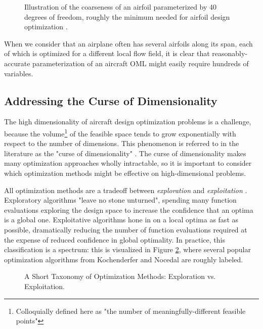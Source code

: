 \begin{figure}[H]
    \centering
    \ifdraft{}{}
    \caption{Illustration of the coarseness of an airfoil parameterized by 40 degrees of freedom\protect\footnotemark, roughly the minimum needed for airfoil design optimization \cite{masters2017}.}
    \label{fig:airfoil-fig}
\end{figure}

When we consider that an airplane often has several airfoils along its span, each of which is optimized for a different local flow field, it is clear that reasonably-accurate parameterization of an aircraft OML might easily require hundreds of variables.

\subsection{Addressing the Curse of Dimensionality}

The high dimensionality of aircraft design optimization problems is a challenge, because the volume\footnote{Colloquially defined here as "the number of meaningfully-different feasible points"} of the feasible space tends to grow exponentially with respect to the number of dimensions. This phenomenon is referred to in the literature as the "curse of dimensionality" \cite{mdobook, mpk2017}. The curse of dimensionality makes many optimization approaches wholly intractable, so it is important to consider which optimization methods might be effective on high-dimensional problems.

All optimization methods are a tradeoff between \textit{exploration} and \textit{exploitation} \cite{faury2018, jasrasaria2018}. Exploratory algorithms "leave no stone unturned", spending many function evaluations exploring the design space to increase the confidence that an optima is a global one. Exploitative algorithms hone in on a local optima as fast as possible, dramatically reducing the number of function evaluations required at the expense of reduced confidence in global optimality. In practice, this classification is a spectrum: this is visualized in Figure \ref{fig:exploration-exploitation}, where several popular optimization algorithms from Kochenderfer \cite{koch2019} and Nocedal \cite{nocedal2006} are roughly labeled.

\begin{figure}[H]
    \centerline{}
    \caption{A Short Taxonomy of Optimization Methods: Exploration vs. Exploitation.}
    \label{fig:exploration-exploitation}
\end{figure}

